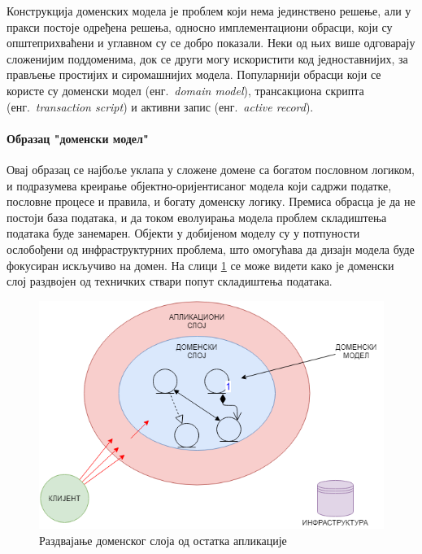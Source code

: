 \documentclass[12pt,oneside]{memoir}
\begin{document}
Конструкција доменских модела је проблем који нема јединствено решење, али у пракси постоје одређена решења, односно имплементациони обрасци, који су општеприхваћени и углавном су се добро показали. Неки од њих више одговарају сложенијим поддоменима, док се други могу искористити код једноставнијих, за прављење простијих и сиромашнијих модела. Популарнији обрасци који се користе су доменски модел (енг.~\textit{domain model}), трансакциона скрипта (енг.~\textit{transaction script}) и активни запис (енг.~\textit{active record})\cite{peaa}.

\paragraph{Образац "доменски модел"}
Овај образац се најбоље уклапа у сложене домене са богатом пословном логиком, и подразумева креирање објектно-оријентисаног модела који садржи податке, пословне процесе и правила, и богату доменску логику. Премиса обрасца је да не постоји база података, и да током еволуирања модела проблем складиштења података буде занемарен. Објекти у добијеном моделу су у потпуности ослобођени од инфраструктурних проблема, што омогућава да дизајн модела буде фокусиран искључиво на домен. На слици \ref{fig:razdvajanjedomenskogsloja} се може видети како је доменски слој раздвојен од техничких ствари попут складиштења података.

\begin{figure}[!ht]
  \centering
  \includegraphics[scale=0.6]{slike/razdvajanje-domenskog-sloja.png}
  \caption{Раздвајање доменског слоја од остатка апликације}
  \label{fig:razdvajanjedomenskogsloja}
\end{figure}
\end{document}
